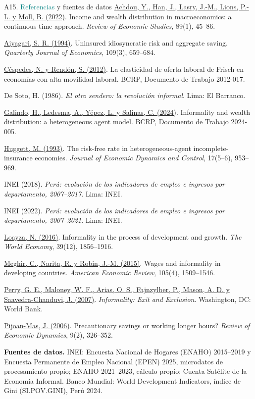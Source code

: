 \documentclass[aspectratio=169,11pt]{beamer}
\newcommand{\teal}[1]{\textcolor{Teal}{#1}}
\begin{document}
\begin{frame}[label=a9]{A15. \teal{Referencias} y fuentes de datos}
\scriptsize
\setlength{\parskip}{1.2mm}
\href{https://doi.org/10.1093/restud/rdab002}{Achdou, Y., Han, J., Lasry, J.-M., Lions, P.-L. y Moll, B. (2022)}. Income and wealth distribution in macroeconomics: a continuous-time approach. \textit{Review of Economic Studies}, 89(1), 45--86.

\href{https://doi.org/10.2307/2118417}{Aiyagari, S. R. (1994)}. Uninsured idiosyncratic risk and aggregate saving. \textit{Quarterly Journal of Economics}, 109(3), 659--684.

\href{https://ideas.repec.org/p/rbp/wpaper/2012-017.html}{Céspedes, N. y Rendón, S. (2012)}. La elasticidad de oferta laboral de Frisch en economías con alta movilidad laboral. BCRP, Documento de Trabajo 2012-017.

De Soto, H. (1986). \textit{El otro sendero: la revolución informal}. Lima: El Barranco.

\href{https://ideas.repec.org/p/rbp/wpaper/2024-005.html}{Galindo, H., Ledesma, A., Yépez, L. y Salinas, C. (2024)}. Informality and wealth distribution: a heterogeneous agent model. BCRP, Documento de Trabajo 2024-005.

\href{https://doi.org/10.1016/0165-1889(93)90024-M}{Huggett, M. (1993)}. The risk-free rate in heterogeneous-agent incomplete-insurance economies. \textit{Journal of Economic Dynamics and Control}, 17(5--6), 953--969.

INEI (2018). \textit{Perú: evolución de los indicadores de empleo e ingresos por departamento, 2007--2017}. Lima: INEI.

INEI (2022). \textit{Perú: evolución de los indicadores de empleo e ingresos por departamento, 2007--2021}. Lima: INEI.

\href{https://doi.org/10.1111/twec.12480}{Loayza, N. (2016)}. Informality in the process of development and growth. \textit{The World Economy}, 39(12), 1856--1916.

\href{https://doi.org/10.1257/aer.20121110}{Meghir, C., Narita, R. y Robin, J.-M. (2015)}. Wages and informality in developing countries. \textit{American Economic Review}, 105(4), 1509--1546.

\href{https://doi.org/10.1596/978-0-8213-7092-6}{Perry, G. E., Maloney, W. F., Arias, O. S., Fajnzylber, P., Mason, A. D. y Saavedra-Chanduvi, J. (2007)}. \textit{Informality: Exit and Exclusion}. Washington, DC: World Bank.

\href{https://doi.org/10.1016/j.red.2005.11.002}{Pijoan-Mas, J. (2006)}. Precautionary savings or working longer hours? \textit{Review of Economic Dynamics}, 9(2), 326--352.

\textbf{Fuentes de datos.} INEI: Encuesta Nacional de Hogares (ENAHO) 2015--2019 y Encuesta Permanente de Empleo Nacional (EPEN) 2025, microdatos de procesamiento propio; ENAHO 2021--2023, cálculo propio; Cuenta Satélite de la Economía Informal.
Banco Mundial: World Development Indicators, índice de Gini (SI.POV.GINI), Perú 2024.
\end{frame}
\end{document}
